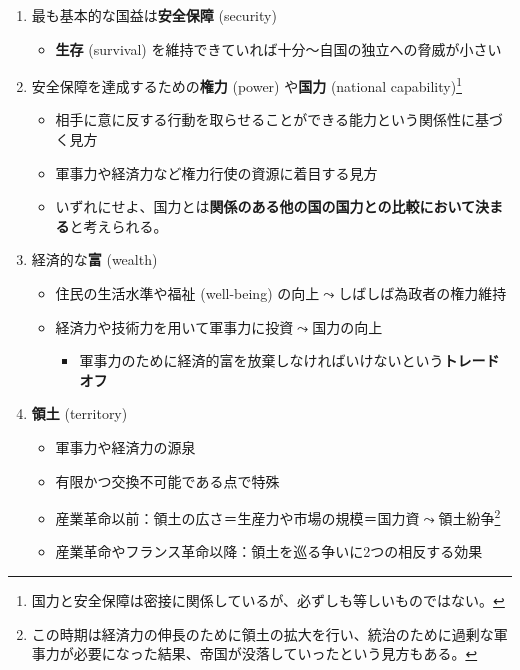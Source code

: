 \documentclass[
  xelatex,
  ja=standard]{bxjsarticle}
\providecommand{\tightlist}{%
  \setlength{\itemsep}{0pt}\setlength{\parskip}{0pt}}\usepackage{longtable,booktabs,array}
\begin{document}
\begin{enumerate}
\def\labelenumi{\arabic{enumi}.}
\tightlist
\item
  最も基本的な国益は\textbf{安全保障} (security)

  \begin{itemize}
  \tightlist
  \item
    \textbf{生存} (survival)
    を維持できていれば十分〜自国の独立への脅威が小さい
  \end{itemize}
\item
  安全保障を達成するための\textbf{権力} (power) や\textbf{国力}
  (national capability)\footnote{国力と安全保障は密接に関係しているが、必ずしも等しいものではない。}

  \begin{itemize}
  \tightlist
  \item
    相手に意に反する行動を取らせることができる能力という関係性に基づく見方
  \item
    軍事力や経済力など権力行使の資源に着目する見方
  \item
    いずれにせよ、国力とは\textbf{関係のある他の国の国力との比較において決まる}と考えられる。
  \end{itemize}
\item
  経済的な\textbf{富} (wealth)

  \begin{itemize}
  \tightlist
  \item
    住民の生活水準や福祉 (well-being)
    の向上\(\leadsto\)しばしば為政者の権力維持
  \item
    経済力や技術力を用いて軍事力に投資\(\leadsto\)国力の向上

    \begin{itemize}
    \tightlist
    \item
      軍事力のために経済的富を放棄しなければいけないという\textbf{トレードオフ}
    \end{itemize}
  \end{itemize}
\item
  \textbf{領土} (territory)

  \begin{itemize}
  \tightlist
  \item
    軍事力や経済力の源泉
  \item
    有限かつ交換不可能である点で特殊
  \item
    産業革命以前：領土の広さ＝生産力や市場の規模＝国力資\(\leadsto\)領土紛争\footnote{この時期は経済力の伸長のために領土の拡大を行い、統治のために過剰な軍事力が必要になった結果、帝国が没落していったという見方もある\citep{kennedy1993}。}
  \item
    産業革命やフランス革命以降：領土を巡る争いに2つの相反する効果


\end{itemize}
\end{enumerate}
\end{document}
